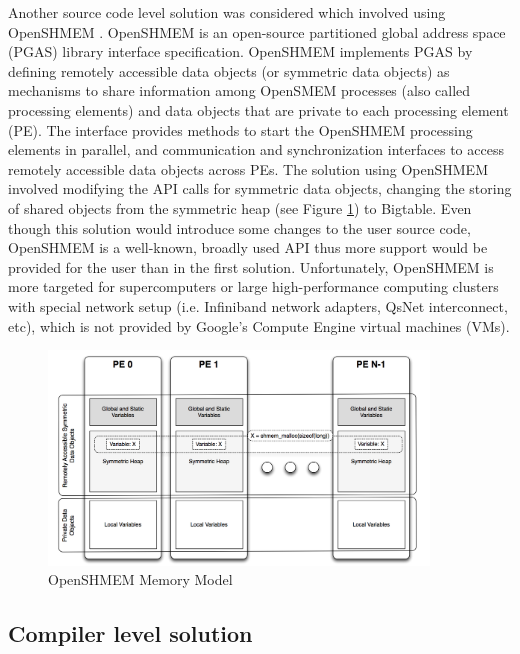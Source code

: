 \documentclass[bsc,frontabs,twoside,singlespacing,parskip,deptreport]{infthesis}     %
\begin{document}
Another source code level solution was considered which involved using OpenSHMEM \citep{openshmem}. OpenSHMEM is an open-source partitioned global address space (PGAS) library interface specification. OpenSHMEM implements PGAS by defining remotely accessible data objects (or symmetric data objects) as mechanisms to share information among OpenSMEM processes (also called processing elements) and data objects that are private to each processing element (PE). The interface provides methods to start the OpenSHMEM processing elements in parallel, and communication and synchronization interfaces to access remotely accessible data objects across PEs. The solution using OpenSHMEM involved modifying the API calls for symmetric data objects, changing the storing of shared objects from the symmetric heap (see Figure \ref{fig:openshmem_memory_model}) to Bigtable. Even though this solution would introduce some changes to the user source code, OpenSHMEM is a well-known, broadly used API thus more support would be provided for the user than in the first solution. Unfortunately, OpenSHMEM is more targeted for supercomputers or large high-performance computing clusters with special network setup (i.e. Infiniband network adapters, QsNet interconnect, etc), which is not provided by Google's Compute Engine virtual machines (VMs).

\begin{figure}[H]
\centering
\includegraphics[width=0.9\textwidth]{images/openshmem_memory_model}
\caption{OpenSHMEM Memory Model \cite[source:][]{openshmem_fig}}
\label{fig:openshmem_memory_model}
\end{figure}

\subsection{Compiler level solution}
\end{document}
